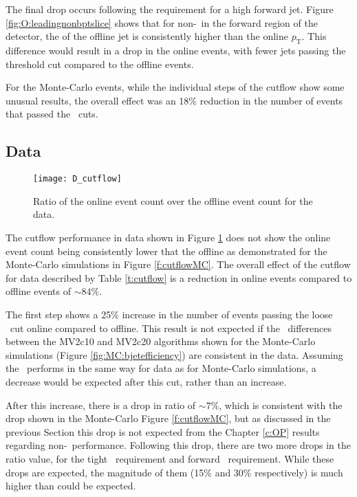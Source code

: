     The final drop occurs following the requirement for a high \pt forward jet. Figure \ref{fig:O:leadingnonbptslice} shows that for non-\bjets\ in the forward region of the detector, the \pt of the offline jet is consistently higher than the online $p_\text{T}$. This difference would result in a drop in the online events, with fewer jets passing the threshold \pt cut compared to the offline events.

    For the Monte-Carlo events, while the individual steps of the cutflow show some unusual results, the overall effect was an 18\% reduction in the number of events that passed the \VBFHBB\, cuts.

    \subsection{Data}
        \begin{figure}[h]
            \centering
            \texttt{[image: D\_cutflow]}
            \caption[\VBFHBB\ Cutflow ratio for data]{Ratio of the online event count over the offline event count for the data.}
            \label{f:cutflowD}
        \end{figure}

    The cutflow performance in data shown in Figure \ref{f:cutflowD} does not show the online event count being consistently lower that the offline as demonstrated for the Monte-Carlo simulations in Figure \ref{f:cutflowMC}. The overall effect of the cutflow for data described by Table \ref{t:cutflow} is a reduction in online events compared to offline events of $\sim84\%$.

    The first step shows a 25\% increase in the number of events passing the loose \bjets\ cut online compared to offline. This result is not expected if the \btag\ differences between the MV2c10 and MV2c20 algorithms shown for the Monte-Carlo simulations (Figure \ref{fig:MC:bjetefficiency}) are consistent in the data. Assuming the \btag\ performs in the same way for data as for Monte-Carlo simulations, a decrease would be expected after this cut, rather than an increase.

    After this increase, there is a drop in ratio of $\sim 7\%$, which is consistent with the drop shown in the Monte-Carlo Figure \ref{f:cutflowMC}, but as discussed in the previous Section this drop is not expected from the Chapter \ref{c:OP} results regarding non-\bjet\ performance. Following this drop, there are two more drops in the ratio value, for the tight \bjet\ requirement and forward \bjet\ requirement. While these drops are expected, the magnitude of them (15\% and 30\% respectively) is much higher than could be expected.


